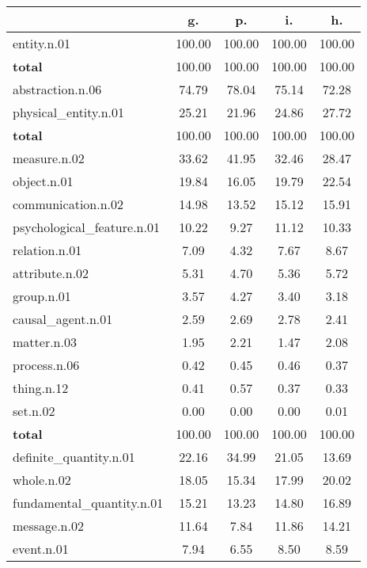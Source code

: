 \begin{table}[h!]
\begin{center}
\begin{tabular}{| l || c | c | c | c |}\hline
 & {\bf g.} & {\bf p.} & {\bf i.} & {\bf h.} \\\hline\hline
entity.n.01 & 100.00  & 100.00  & 100.00  & 100.00 \\\hline\hline
{{\bf total}} & 100.00  & 100.00  & 100.00  & 100.00 \\\hline\hline\hline
abstraction.n.06 & 74.79  & 78.04  & 75.14  & 72.28 \\\hline
physical\_entity.n.01 & 25.21  & 21.96  & 24.86  & 27.72 \\\hline\hline
{{\bf total}} & 100.00  & 100.00  & 100.00  & 100.00 \\\hline\hline\hline
measure.n.02 & 33.62  & 41.95  & 32.46  & 28.47 \\\hline
object.n.01 & 19.84  & 16.05  & 19.79  & 22.54 \\\hline
communication.n.02 & 14.98  & 13.52  & 15.12  & 15.91 \\\hline
psychological\_feature.n.01 & 10.22  & 9.27  & 11.12  & 10.33 \\\hline
relation.n.01 & 7.09  & 4.32  & 7.67  & 8.67 \\\hline
attribute.n.02 & 5.31  & 4.70  & 5.36  & 5.72 \\\hline
group.n.01 & 3.57  & 4.27  & 3.40  & 3.18 \\\hline
causal\_agent.n.01 & 2.59  & 2.69  & 2.78  & 2.41 \\\hline
matter.n.03 & 1.95  & 2.21  & 1.47  & 2.08 \\\hline
process.n.06 & 0.42  & 0.45  & 0.46  & 0.37 \\\hline
thing.n.12 & 0.41  & 0.57  & 0.37  & 0.33 \\\hline
set.n.02 & 0.00  & 0.00  & 0.00  & 0.01 \\\hline\hline
{{\bf total}} & 100.00  & 100.00  & 100.00  & 100.00 \\\hline\hline\hline
definite\_quantity.n.01 & 22.16  & 34.99  & 21.05  & 13.69 \\\hline
whole.n.02 & 18.05  & 15.34  & 17.99  & 20.02 \\\hline
fundamental\_quantity.n.01 & 15.21  & 13.23  & 14.80  & 16.89 \\\hline
message.n.02 & 11.64  & 7.84  & 11.86  & 14.21 \\\hline
event.n.01 & 7.94  & 6.55  & 8.50  & 8.59 \\\hline

\end{tabular}
\end{center}
\end{table}
